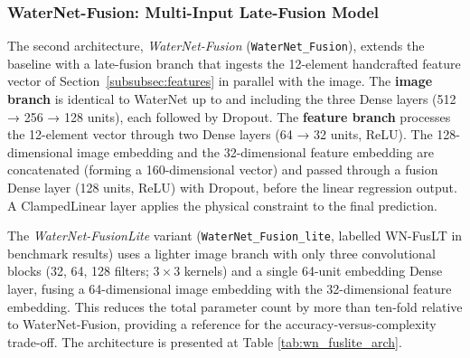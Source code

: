 \subsubsection{WaterNet-Fusion: Multi-Input Late-Fusion Model}
\label{subsubsec:waternet_fusion}

The second architecture, \textit{WaterNet-Fusion} (\texttt{WaterNet\_Fusion}), extends the baseline with a late-fusion branch that ingests the 12-element handcrafted feature vector of Section~\ref{subsubsec:features} in parallel with the image. The \textbf{image branch} is identical to WaterNet up to and including the three Dense layers (512 → 256 → 128 units), each followed by Dropout. The \textbf{feature branch} processes the 12-element vector through two Dense layers (64 → 32 units, ReLU). The 128-dimensional image embedding and the 32-dimensional feature embedding are concatenated (forming a 160-dimensional vector) and passed through a fusion Dense layer (128 units, ReLU) with Dropout, before the linear regression output. A ClampedLinear layer applies the physical constraint to the final prediction.

The \textit{WaterNet-FusionLite} variant (\texttt{WaterNet\_Fusion\_lite}, labelled WN-FusLT in benchmark results) uses a lighter image branch with only three convolutional blocks (32, 64, 128 filters; $3\times3$ kernels) and a single 64-unit embedding Dense layer, fusing a 64-dimensional image embedding with the 32-dimensional feature embedding. This reduces the total parameter count by more than ten-fold relative to WaterNet-Fusion, providing a reference for the accuracy-versus-complexity trade-off. The architecture is presented at Table \ref{tab:wn_fuslite_arch}.

